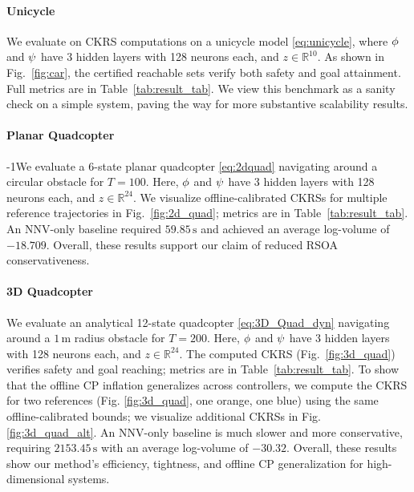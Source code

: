 \endgroup

\paragraph{Unicycle}
We evaluate on CKRS computations on a unicycle model \eqref{eq:unicycle}, where $\phi$ and $\psi$ have 3 hidden layers with 128 neurons each, and $z \in \mathbb{R}^{10}$. As shown in Fig.~\ref{fig:car}, the certified reachable sets verify both safety and goal attainment. Full metrics are in Table~\ref{tab:result_tab}. We view this benchmark as a sanity check on a simple system, paving the way for more substantive scalability results.

\paragraph{Planar Quadcopter}
\looseness-1We evaluate a 6-state planar quadcopter \eqref{eq:2dquad} navigating around a circular obstacle for $T=100$. Here, $\phi$ and $\psi$ have 3 hidden layers with 128 neurons each, and $z \in \mathbb{R}^{24}$. We visualize offline-calibrated CKRSs for multiple reference trajectories in Fig.~\ref{fig:2d_quad}; metrics are in Table~\ref{tab:result_tab}. An NNV-only baseline \citep{sage-mp} required $59.85\,\mathrm{s}$ and achieved an average log-volume of $-18.709$. Overall, these results support our claim of reduced RSOA conservativeness. 

\paragraph{3D Quadcopter}
\label{sec:3dquad}
We evaluate an analytical 12-state quadcopter \eqref{eq:3D_Quad_dyn} \citep{sabatino2015quadrotor} navigating around a $1\,\mathrm{m}$ radius obstacle for $T=200$. Here, $\phi$ and $\psi$ have 3 hidden layers with 128 neurons each, and $z \in \mathbb{R}^{24}$. The computed CKRS (Fig.~\ref{fig:3d_quad}) verifies safety and goal reaching; metrics are in Table~\ref{tab:result_tab}. To show that the offline CP inflation generalizes across controllers, we compute the CKRS for two references (Fig. \ref{fig:3d_quad}, one orange, one blue) using the same offline-calibrated bounds; we visualize additional CKRSs in Fig. \ref{fig:3d_quad_alt}. An NNV-only baseline \citep{sage-mp} is much slower and more conservative, requiring $2153.45\,\mathrm{s}$ with an average log-volume of $-30.32$. Overall, these results show our method's efficiency, tightness, and offline CP generalization for high-dimensional systems.

